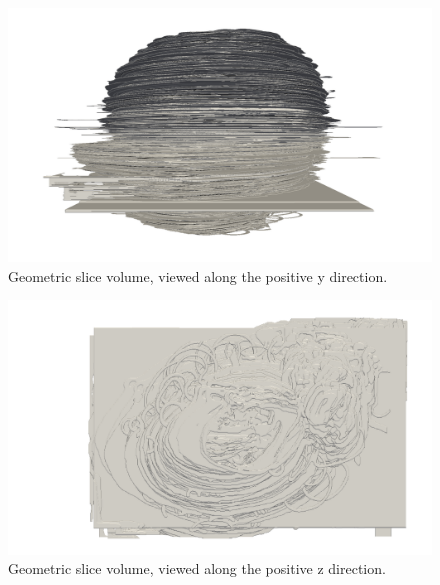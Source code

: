 	\begin{figure}
	  \centering
	  \includegraphics[width=0.9\textheight]{Ch7/Figs/Rat28/contours/whole_positive_y_geometric}
	  \caption{Geometric slice volume, viewed along the positive y direction.}
	  \label{fig:positive_y_geometric_contour}
	\end{figure}

	\begin{figure}
	  \centering
	  \includegraphics[width=0.9\textheight]{Ch7/Figs/Rat28/contours/whole_positive_z_geometric}
	  \caption{Geometric slice volume, viewed along the positive z direction.}
	  \label{fig:positive_z_geometric_contour}
	\end{figure}

